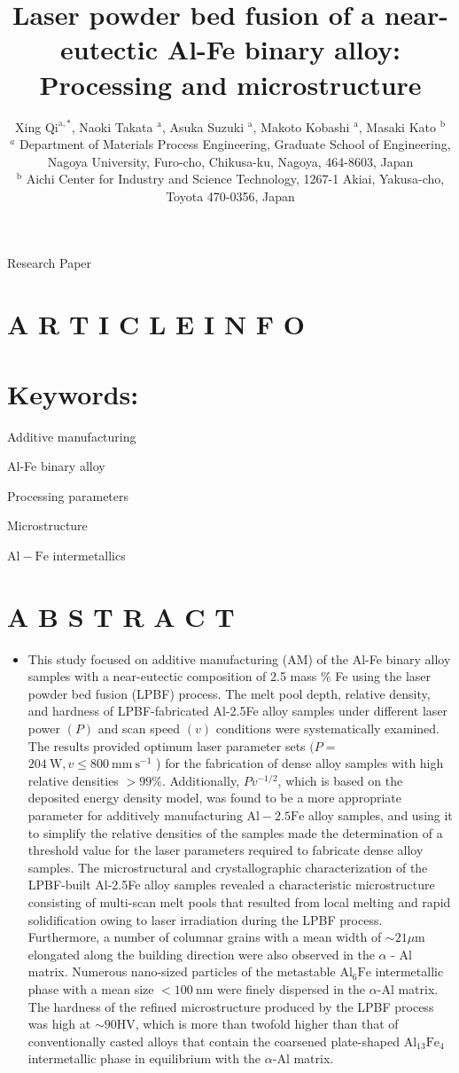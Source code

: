 \documentclass[10pt]{article}
\title{Laser powder bed fusion of a near-eutectic Al-Fe binary alloy: Processing and microstructure }
\author{Xing $\mathrm{Qi}^{\mathrm{a}, *}$, Naoki Takata ${ }^{\mathrm{a}}$, Asuka Suzuki ${ }^{\mathrm{a}}$, Makoto Kobashi ${ }^{\mathrm{a}}$, Masaki Kato ${ }^{\mathrm{b}}$\\
${ }^{a}$ Department of Materials Process Engineering, Graduate School of Engineering, Nagoya University, Furo-cho, Chikusa-ku, Nagoya, 464-8603, Japan\\
${ }^{\mathrm{b}}$ Aichi Center for Industry and Science Technology, 1267-1 Akiai, Yakusa-cho, Toyota 470-0356, Japan}
\date{}
\begin{document}
\maketitle
Research Paper



\section*{A R T I C L E I N F O}
\section*{Keywords:}
Additive manufacturing

Al-Fe binary alloy

Processing parameters

Microstructure

$\mathrm{Al}-\mathrm{Fe}$ intermetallics

\section*{A B S T R A C T}
\begin{itemize}
  \item This study focused on additive manufacturing (AM) of the Al-Fe binary alloy samples with a near-eutectic composition of 2.5 mass $\%$ Fe using the laser powder bed fusion (LPBF) process. The melt pool depth, relative density, and hardness of LPBF-fabricated Al-2.5Fe alloy samples under different laser power $(P)$ and scan speed $(v)$ conditions were systematically examined. The results provided optimum laser parameter sets $(P=$ $204 \mathrm{~W}, v \leq 800 \mathrm{~mm} \mathrm{~s}^{-1}$ ) for the fabrication of dense alloy samples with high relative densities $>99 \%$. Additionally, $P v^{-1 / 2}$, which is based on the deposited energy density model, was found to be a more appropriate parameter for additively manufacturing $\mathrm{Al}-2.5 \mathrm{Fe}$ alloy samples, and using it to simplify the relative densities of the samples made the determination of a threshold value for the laser parameters required to fabricate dense alloy samples. The microstructural and crystallographic characterization of the LPBF-built Al-2.5Fe alloy samples revealed a characteristic microstructure consisting of multi-scan melt pools that resulted from local melting and rapid solidification owing to laser irradiation during the LPBF process. Furthermore, a number of columnar grains with a mean width of $\sim 21 \mu \mathrm{m}$ elongated along the building direction were also observed in the $\alpha$ - $\mathrm{Al}$ matrix. Numerous nano-sized particles of the metastable $\mathrm{Al}_{6} \mathrm{Fe}$ intermetallic phase with a mean size $<100 \mathrm{~nm}$ were finely dispersed in the $\alpha$-Al matrix. The hardness of the refined microstructure produced by the LPBF process was high at $\sim 90 \mathrm{HV}$, which is more than twofold higher than that of conventionally casted alloys that contain the coarsened plate-shaped $\mathrm{Al}_{13} \mathrm{Fe}_{4}$ intermetallic phase in equilibrium with the $\alpha$-Al matrix.
\end{itemize}
\end{document}
